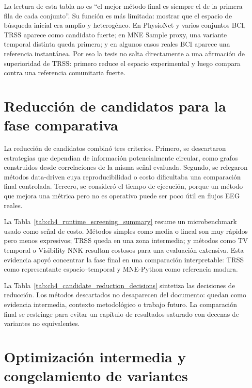 

La lectura de esta tabla no es “el mejor método final es siempre el de la primera fila de cada conjunto”. Su función es más limitada: mostrar que el espacio de búsqueda inicial era amplio y heterogéneo. En PhysioNet y varios conjuntos BCI, TRSS aparece como candidato fuerte; en MNE Sample proxy, una variante temporal distinta queda primera; y en algunos casos reales BCI aparece una referencia instantánea. Por eso la tesis no salta directamente a una afirmación de superioridad de TRSS: primero reduce el espacio experimental y luego compara contra una referencia comunitaria fuerte.

\section{Reducción de candidatos para la fase comparativa}

La reducción de candidatos combinó tres criterios. Primero, se descartaron estrategias que dependían de información potencialmente circular, como grafos construidos desde correlaciones de la misma señal evaluada. Segundo, se relegaron métodos data-driven cuya reproducibilidad o costo dificultaba una comparación final controlada. Tercero, se consideró el tiempo de ejecución, porque un método que mejora una métrica pero no es operativo puede ser poco útil en flujos EEG reales.

La Tabla~\ref{tab:ch4_runtime_screening_summary} resume un microbenchmark usado como señal de costo. Métodos simples como media o lineal son muy rápidos pero menos expresivos; TRSS queda en una zona intermedia; y métodos como TV temporal o Visibility NNK resultan costosos para una evaluación extensiva. Esta evidencia apoyó concentrar la fase final en una comparación interpretable: TRSS como representante espacio--temporal y MNE-Python como referencia madura.



La Tabla~\ref{tab:ch4_candidate_reduction_decisions} sintetiza las decisiones de reducción. Los métodos descartados no desaparecen del documento: quedan como evidencia intermedia, contexto metodológico o trabajo futuro. La comparación final se restringe para evitar un capítulo de resultados saturado con decenas de variantes no equivalentes.



\section{Optimización intermedia y congelamiento de variantes}

